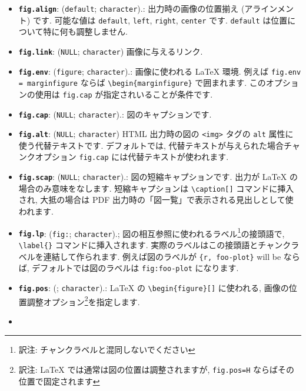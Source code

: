 \documentclass[
  11pt,
  lualatex,ja=standard,jafont=noto]{bxjsreport}
\begin{document}
\begin{itemize}
\item
  \textbf{\texttt{fig.align}}: (\texttt{\textquotesingle{}default\textquotesingle{}}; \texttt{character}).: 出力時の画像の位置揃え (アラインメント) です. 可能な値は \texttt{default}, \texttt{left}, \texttt{right}, \texttt{center} です. \texttt{default} は位置について特に何も調整しません.
\item
  \textbf{\texttt{fig.link}}: (\texttt{NULL}; \texttt{character}) 画像に与えるリンク.
\item
  \textbf{\texttt{fig.env}}: (\texttt{\textquotesingle{}figure\textquotesingle{}}; \texttt{character}).: 画像に使われる LaTeX 環境. 例えば \texttt{fig.env = \textquotesingle{}marginfigure\textquotesingle{}} ならば \texttt{\textbackslash{}begin\{marginfigure\}} で囲まれます. このオプションの使用は \texttt{fig.cap} が指定されいることが条件です.
\item
  \textbf{\texttt{fig.cap}}: (\texttt{NULL}; \texttt{character}).: 図のキャプションです.
\item
  \textbf{\texttt{fig.alt}}: (\texttt{NULL}; \texttt{character}) HTML 出力時の図の \texttt{\textless{}img\textgreater{}} タグの \texttt{alt} 属性に使う代替テキストです. デフォルトでは, 代替テキストが与えられた場合チャンクオプション \texttt{fig.cap} には代替テキストが使われます.
\item
  \textbf{\texttt{fig.scap}}: (\texttt{NULL}; \texttt{character}).: 図の短縮キャプションです. 出力が LaTeX の場合のみ意味をなします. 短縮キャプションは \texttt{\textbackslash{}caption{[}{]}} コマンドに挿入され, 大抵の場合は PDF 出力時の「図一覧」で表示される見出しとして使われます.
\item
  \textbf{\texttt{fig.lp}}: (\texttt{\textquotesingle{}fig:\textquotesingle{}}; \texttt{character}).; 図の相互参照に使われるラベル\footnote{訳注: チャンクラベルと混同しないでください}の接頭語で, \texttt{\textbackslash{}label\{\}} コマンドに挿入されます. 実際のラベルはこの接頭語とチャンクラベルを連結して作られます. 例えば図のラベルが \texttt{\textasciigrave{}\textasciigrave{}\textasciigrave{}\{r,\ foo-plot\}} will be ならば, デフォルトでは図のラベルは \texttt{fig:foo-plot} になります.
\item
  \textbf{\texttt{fig.pos}}: (\texttt{\textquotesingle{}\textquotesingle{}}; \texttt{character}).: LaTeX の \texttt{\textbackslash{}begin\{figure\}{[}{]}} に使われる, 画像の位置調整オプション\footnote{訳注: LaTeX では通常は図の位置は調整されますが, \texttt{fig.pos=\textquotesingle{}H\textquotesingle{}} ならばその位置で固定されます}を指定します.
\item

\end{itemize}
\end{document}
